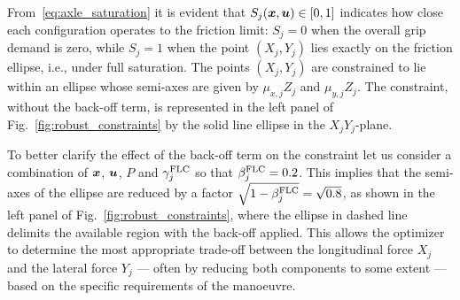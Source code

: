 From~\eqref{eq:axle_saturation} it is evident that $S_j(\boldsymbol{x},\boldsymbol{u})\in [0,1]$ indicates how close each configuration operates to the friction limit: $S_j=0$ when the overall grip demand is zero, while $S_j = 1$ when the point $\left(X_j, Y_j\right)$ lies exactly on the friction ellipse, i.e., under full saturation.
The points $\left(X_j,Y_j\right)$ are constrained to lie within an ellipse whose semi-axes are given by $\mu_{x,j}Z_j$ and $\mu_{y,j}Z_j$. The constraint, without the back-off term, is represented in the left panel of Fig.~\ref{fig:robust_constraints} by the solid line ellipse in the $X_jY_j$-plane.

To better clarify the effect of the back-off term on the constraint let us consider a combination of $\boldsymbol{x}$, $\boldsymbol{u}$, $P$ and $\gamma^\textrm{FLC}_j$ so that $\beta^\textrm{FLC}_j=0.2$. This implies that the semi-axes of the ellipse are reduced by a factor $\sqrt{1-\beta^\textrm{FLC}_j} = \sqrt{0.8}$, as shown in the left panel of Fig.~\ref{fig:robust_constraints}, where the ellipse in dashed line delimits the available region with the back-off applied. This allows the optimizer to determine the most appropriate trade-off between the longitudinal force $X_j$ and the lateral force $Y_j$ --- often by reducing both components to some extent --- based on the specific requirements of the manoeuvre.


